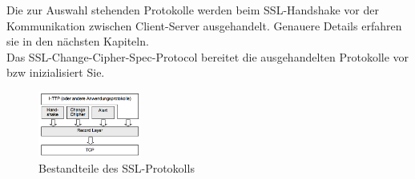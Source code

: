 \documentclass[11pt]{scrartcl}
\begin{document}
\noindent
Die zur Auswahl stehenden Protokolle werden beim SSL-Handshake vor der Kommunikation zwischen Client-Server ausgehandelt. Genauere Details erfahren sie in den nächsten Kapiteln.\\
\grqq{}Das SSL-Change-Cipher-Spec-Protocol bereitet die ausgehandelten Protokolle vor bzw inizialisiert Sie.\grqq{}\cite{6}
\cite{6}
\begin{figure}[H]
\includegraphics[width=0.30\textwidth]{Bilder/TLS/SSLTLS-TCPIP}
	\caption{Bestandteile des SSL-Protokolls \cite{1}}
	\label{fig14}
\end{figure}
\end{document}

